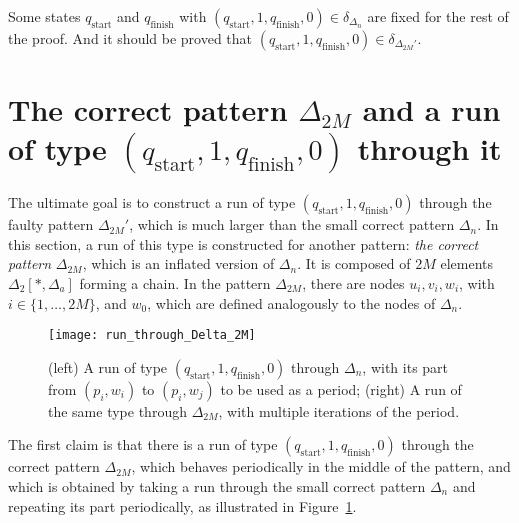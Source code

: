 \documentclass[12pt,a4paper]{article}
\theoremstyle{definition}
\begin{document}
Some states $q_{\text{start}}$ and $q_{\text{finish}}$
with $(q_{\text{start}},1,q_{\text{finish}},0) \in \delta_{\Delta_n}$
are fixed for the rest of the proof.
And it should be proved that $(q_{\text{start}},1,q_{\text{finish}},0) \in \delta_{\Delta_{2M}'}$.






\section{The correct pattern $\Delta_{2M}$ and a run of type $(q_{\text{start}},1,q_{\text{finish}},0)$ through it}\label{section_passing_through_Delta_2M}

The ultimate goal is to construct a run of type $(q_{\text{start}},1,q_{\text{finish}},0)$
through the faulty pattern $\Delta_{2M}'$,
which is much larger than the small correct pattern $\Delta_n$.
In this section, a run of this type is constructed for another pattern:
\emph{the correct pattern} $\Delta_{2M}$, which is an inflated version of $\Delta_n$.
It is composed of $2M$ elements $\Delta_2[*,\Delta_a]$ forming a chain.
In the pattern $\Delta_{2M}$, there are nodes $u_i,v_i,w_i$, with $i \in \{1,\ldots,2M\}$,
and $w_0$, which are defined analogously to the nodes of $\Delta_n$.

\begin{figure}[hbtp]
	\centerline{\texttt{[image: run\_through\_Delta\_2M]}}
	\caption{(left) A run of type $(q_{\text{start}},1,q_{\text{finish}},0)$
		through $\Delta_n$, with its part from $(p_i, w_i)$ to $(p_i, w_j)$ to be used as a period;
		(right) A run of the same type through $\Delta_{2M}$, with multiple iterations of the period.}
	\label{f:run_through_Delta_2M}
\end{figure}

The first claim is that there is a run of type $(q_{\text{start}},1,q_{\text{finish}},0)$
through the correct pattern $\Delta_{2M}$,
which behaves periodically in the middle of the pattern,
and which is obtained by taking a run
through the small correct pattern $\Delta_n$
and repeating its part periodically,
as illustrated in Figure~\ref{f:run_through_Delta_2M}.
\end{document}
